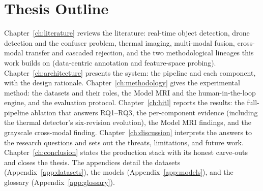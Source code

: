 \section{Thesis Outline}
\label{sec:outline}

Chapter~\ref{ch:literature} reviews the literature: real-time object detection, drone detection and the confuser problem, thermal imaging, multi-modal fusion, cross-modal transfer and cascaded rejection, and the two methodological lineages this work builds on (data-centric annotation and feature-space probing). Chapter~\ref{ch:architecture} presents the system: the pipeline and each component, with the design rationale. Chapter~\ref{ch:methodology} gives the experimental method: the datasets and their roles, the Model MRI and the human-in-the-loop engine, and the evaluation protocol. Chapter~\ref{ch:hitl} reports the results: the full-pipeline ablation that answers RQ1--RQ3, the per-component evidence (including the thermal detector's six-revision evolution), the Model MRI findings, and the grayscale cross-modal finding. Chapter~\ref{ch:discussion} interprets the answers to the research questions and sets out the threats, limitations, and future work. Chapter~\ref{ch:conclusion} states the production stack with its honest carve-outs and closes the thesis. The appendices detail the datasets (Appendix~\ref{app:datasets}), the models (Appendix~\ref{app:models}), and the glossary (Appendix~\ref{app:glossary}).
